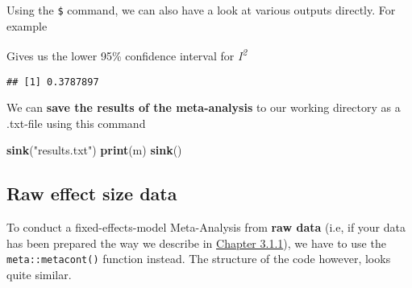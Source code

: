 \documentclass[]{book}
\newenvironment{Shaded}{\begin{snugshade}}{\end{snugshade}}
\newcommand{\KeywordTok}[1]{\textcolor[rgb]{0.13,0.29,0.53}{\textbf{#1}}}
\newcommand{\StringTok}[1]{\textcolor[rgb]{0.31,0.60,0.02}{#1}}
\newcommand{\OperatorTok}[1]{\textcolor[rgb]{0.81,0.36,0.00}{\textbf{#1}}}
\newcommand{\NormalTok}[1]{#1}
\theoremstyle{definition}
\theoremstyle{definition}
\theoremstyle{definition}
\theoremstyle{remark}
\begin{document}
Using the \texttt{\$} command, we can also have a look at various
outputs directly. For example

\begin{Shaded}
\end{Shaded}

Gives us the lower 95\% confidence interval for
\emph{I\textsuperscript{2}}

\begin{verbatim}
## [1] 0.3787897
\end{verbatim}

We can \textbf{save the results of the meta-analysis} to our working
directory as a .txt-file using this command

\begin{Shaded}
\begin{Highlighting}[]
\KeywordTok{sink}\NormalTok{(}\StringTok{"results.txt"}\NormalTok{)}
\KeywordTok{print}\NormalTok{(m)}
\KeywordTok{sink}\NormalTok{()}
\end{Highlighting}
\end{Shaded}

\subsection{Raw effect size data}\label{fixed.raw}

To conduct a fixed-effects-model Meta-Analysis from \textbf{raw data}
(i.e, if your data has been prepared the way we describe in
\protect\hyperlink{excel_preparation}{Chapter 3.1.1}), we have to use
the \texttt{meta::metacont()} function instead. The structure of the
code however, looks quite similar.
\end{document}
